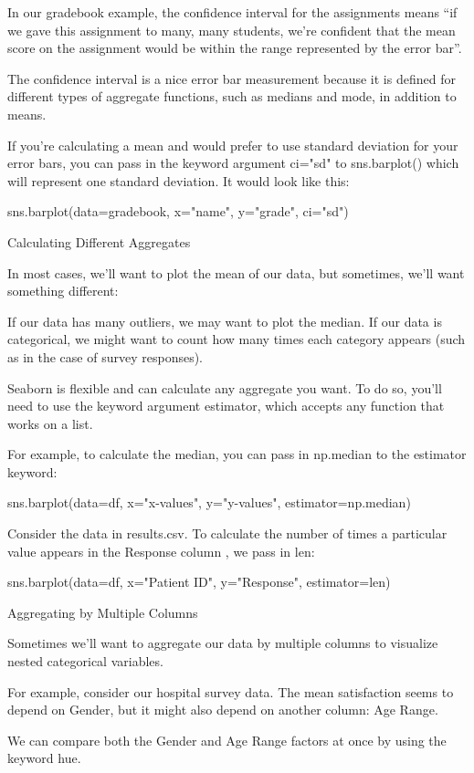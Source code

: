 \documentclass{journal}
\begin{document}
In our gradebook example, the confidence interval for the assignments means “if we gave this assignment to many, many students, we’re confident that the mean score on the assignment would be within the range represented by the error bar”.

The confidence interval is a nice error bar measurement because it is defined for different types of aggregate functions, such as medians and mode, in addition to means.

If you’re calculating a mean and would prefer to use standard deviation for your error bars, you can pass in the keyword argument ci="sd" to sns.barplot() which will represent one standard deviation. It would look like this:

sns.barplot(data=gradebook, x="name", y="grade", ci="sd")



Calculating Different Aggregates

In most cases, we’ll want to plot the mean of our data, but sometimes, we’ll want something different:

    If our data has many outliers, we may want to plot the median.
    If our data is categorical, we might want to count how many times each category appears (such as in the case of survey responses).

Seaborn is flexible and can calculate any aggregate you want. To do so, you’ll need to use the keyword argument estimator, which accepts any function that works on a list.

For example, to calculate the median, you can pass in np.median to the estimator keyword:

sns.barplot(data=df,
  x="x-values",
  y="y-values",
  estimator=np.median)

Consider the data in results.csv. To calculate the number of times a particular value appears in the Response column , we pass in len:

sns.barplot(data=df,
  x="Patient ID",
  y="Response",
  estimator=len)


Aggregating by Multiple Columns

Sometimes we’ll want to aggregate our data by multiple columns to visualize nested categorical variables.

For example, consider our hospital survey data. The mean satisfaction seems to depend on Gender, but it might also depend on another column: Age Range.

We can compare both the Gender and Age Range factors at once by using the keyword hue.
\end{document}
